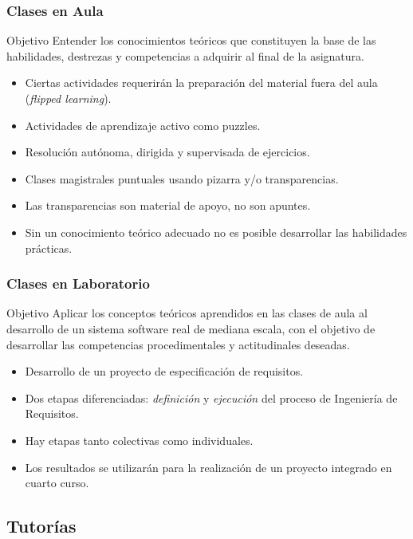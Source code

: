 \documentclass[handout,a4paper,slidestop,xcolor=pst,dvips,blue]{beamer}
\begin{document}
\begin{frame}
	\frametitle{Clases en Aula}
	\begin{block}{Objetivo}
        Entender los conocimientos teóricos que constituyen la base de las habilidades, destrezas y competencias a adquirir al final de la asignatura.
	\end{block}
	\begin{itemize}
        \item<2-> Ciertas actividades requerirán la preparación del material fuera del aula (\emph{flipped learning}).
        \item<3-> Actividades de aprendizaje activo como puzzles. 
		\item<4-> Resolución autónoma, dirigida y supervisada de ejercicios.
		\item<5-> Clases magistrales puntuales usando pizarra y/o transparencias.
		\item<6-> \alert{Las transparencias} son material de apoyo, \alert{no son apuntes}.
		\item<7-> \alert{Sin un conocimiento teórico adecuado no es posible desarrollar las habilidades prácticas}.
	\end{itemize}
\end{frame}

\begin{frame}[c]
	\frametitle{Clases en Laboratorio}
	\begin{block}{Objetivo}
		Aplicar los conceptos teóricos aprendidos en las clases de aula al desarrollo de un sistema software real de mediana escala, con el objetivo
        de desarrollar las competencias procedimentales y actitudinales deseadas.
	\end{block}
	\begin{itemize}
        \item<2-> Desarrollo de un proyecto de especificación de requisitos.
		\item<3-> Dos etapas diferenciadas: \emph{definición} y \emph{ejecución} del proceso de Ingeniería de Requisitos.
        \item<4-> Hay etapas tanto colectivas como individuales.
        \item<5-> Los resultados se utilizarán para la realización de un proyecto integrado en cuarto curso.
	\end{itemize}
\end{frame}

\subsection{Tutorías}
\end{document}
